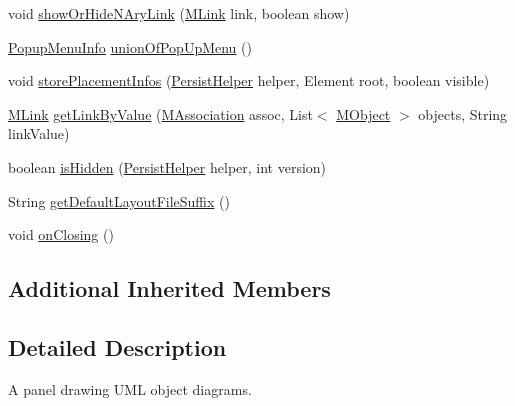 \begin{DoxyCompactItemize}
\item 
void \hyperlink{classorg_1_1tzi_1_1use_1_1gui_1_1views_1_1diagrams_1_1objectdiagram_1_1_new_object_diagram_a1f710d792f4b61aa2a7eaa397bb0d14b}{show\-Or\-Hide\-N\-Ary\-Link} (\hyperlink{interfaceorg_1_1tzi_1_1use_1_1uml_1_1sys_1_1_m_link}{M\-Link} link, boolean show)
\item 
\hyperlink{classorg_1_1tzi_1_1use_1_1gui_1_1views_1_1diagrams_1_1_diagram_view_1_1_popup_menu_info}{Popup\-Menu\-Info} \hyperlink{classorg_1_1tzi_1_1use_1_1gui_1_1views_1_1diagrams_1_1objectdiagram_1_1_new_object_diagram_a652006f1b769d15b61a6f2810ceb10cd}{union\-Of\-Pop\-Up\-Menu} ()
\item 
void \hyperlink{classorg_1_1tzi_1_1use_1_1gui_1_1views_1_1diagrams_1_1objectdiagram_1_1_new_object_diagram_a6ad50500aa39825193a817b3fa40365d}{store\-Placement\-Infos} (\hyperlink{classorg_1_1tzi_1_1use_1_1gui_1_1util_1_1_persist_helper}{Persist\-Helper} helper, Element root, boolean visible)
\item 
\hyperlink{interfaceorg_1_1tzi_1_1use_1_1uml_1_1sys_1_1_m_link}{M\-Link} \hyperlink{classorg_1_1tzi_1_1use_1_1gui_1_1views_1_1diagrams_1_1objectdiagram_1_1_new_object_diagram_ab2920c49cc110264a0493ed94738a62c}{get\-Link\-By\-Value} (\hyperlink{interfaceorg_1_1tzi_1_1use_1_1uml_1_1mm_1_1_m_association}{M\-Association} assoc, List$<$ \hyperlink{interfaceorg_1_1tzi_1_1use_1_1uml_1_1sys_1_1_m_object}{M\-Object} $>$ objects, String link\-Value)
\item 
boolean \hyperlink{classorg_1_1tzi_1_1use_1_1gui_1_1views_1_1diagrams_1_1objectdiagram_1_1_new_object_diagram_afd838258753088f263a68b58f7a99a14}{is\-Hidden} (\hyperlink{classorg_1_1tzi_1_1use_1_1gui_1_1util_1_1_persist_helper}{Persist\-Helper} helper, int version)
\item 
String \hyperlink{classorg_1_1tzi_1_1use_1_1gui_1_1views_1_1diagrams_1_1objectdiagram_1_1_new_object_diagram_a329243f39b6093d4eace2f582bd02576}{get\-Default\-Layout\-File\-Suffix} ()
\item 
void \hyperlink{classorg_1_1tzi_1_1use_1_1gui_1_1views_1_1diagrams_1_1objectdiagram_1_1_new_object_diagram_ac0b1f74032713cba75e4bf39e6552833}{on\-Closing} ()
\end{DoxyCompactItemize}
\subsection*{Additional Inherited Members}


\subsection{Detailed Description}
A panel drawing U\-M\-L object diagrams.

